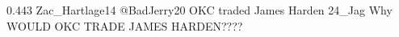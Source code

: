 %
%
%
{0.443}
{\joinNameTweet
{Zac\_Hartlage14}
{@BadJerry20 OKC traded James Harden}}
{\joinNameTweet
{24\_Jag}
{Why WOULD OKC TRADE JAMES HARDEN????}}
%
%
%
%
%
